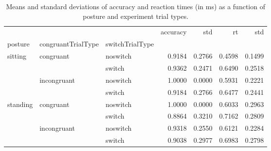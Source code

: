\begin{table}
\centering
\caption{Means and standard deviations of accuracy and reaction times (in ms) as a function of posture and experiment trial types.}
\label{table-task-switching-replication-reaction-time}
\begin{tabular}{lllrrrr}
\toprule
         &             &        & accuracy &    std &     rt &    std \\
posture & congruantTrialType & switchTrialType &          &        &        &        \\
\midrule
sitting & congruant & noswitch &   0.9184 & 0.2766 & 0.4598 & 0.1499 \\
         &             & switch &   0.9362 & 0.2471 & 0.6490 & 0.2518 \\
         & incongruant & noswitch &   1.0000 & 0.0000 & 0.5931 & 0.2221 \\
         &             & switch &   0.9184 & 0.2766 & 0.6477 & 0.2441 \\
standing & congruant & noswitch &   1.0000 & 0.0000 & 0.6033 & 0.2963 \\
         &             & switch &   0.8864 & 0.3210 & 0.7162 & 0.2809 \\
         & incongruant & noswitch &   0.9318 & 0.2550 & 0.6121 & 0.2284 \\
         &             & switch &   0.9038 & 0.2977 & 0.6983 & 0.2798 \\
\bottomrule
\end{tabular}
\end{table}
